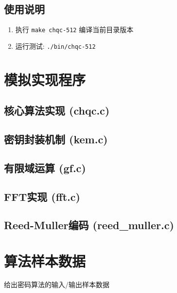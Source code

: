 \documentclass[zihao=-4,fontset=fandol,linespread=1.5]{ctexart}
\begin{document}
\subsection{使用说明}
\begin{enumerate}
    \item 执行 \texttt{make chqc-512} 编译当前目录版本
    \item 运行测试: \texttt{./bin/chqc-512}
\end{enumerate}

\section{模拟实现程序}

\subsection{核心算法实现 (chqc.c)}


\subsection{密钥封装机制 (kem.c)}


\subsection{有限域运算 (gf.c)}


\subsection{FFT实现 (fft.c)}


\subsection{Reed-Muller编码 (reed\_muller.c)}


\section{算法样本数据}

给出密码算法的输入/输出样本数据
\end{document}
